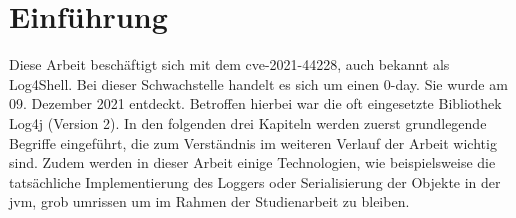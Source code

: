 
\section{Einführung}\label{sec:einfuhrung}
Diese Arbeit beschäftigt sich mit dem \gls{cve}-2021-44228, auch bekannt als Log4Shell.
Bei dieser Schwachstelle handelt es sich um einen 0-day.
Sie wurde am 09. Dezember 2021 entdeckt.
Betroffen hierbei war die oft eingesetzte Bibliothek Log4j (Version 2).
In den folgenden drei Kapiteln werden zuerst grundlegende Begriffe eingeführt, die zum Verständnis im weiteren Verlauf der Arbeit wichtig sind.
Zudem werden in dieser Arbeit einige Technologien, wie beispielsweise die tatsächliche Implementierung des Loggers oder Serialisierung der Objekte in der \gls{jvm}, grob umrissen um im Rahmen der Studienarbeit zu bleiben.



